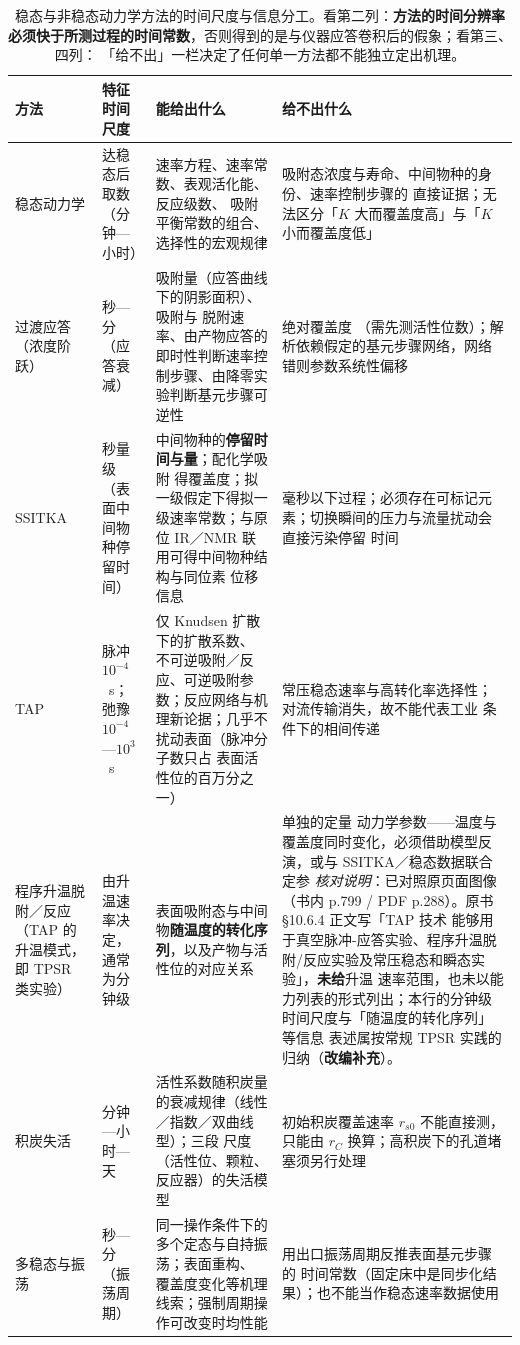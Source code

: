 \begin{table}[tbp]
\centering
\caption{稳态与非稳态动力学方法的时间尺度与信息分工。看第二列：\textbf{方法的时间分辨率
必须快于所测过程的时间常数}，否则得到的是与仪器应答卷积后的假象；看第三、四列：
「给不出」一栏决定了任何单一方法都不能独立定出机理。}
\label{tab:ch10-transient}
{\srcsize
\begin{tabularx}{\twocolwidth}{@{}p{21mm}p{26mm}p{52mm}X@{}}
\toprule
方法 & 特征时间尺度 & 能给出什么 & 给不出什么 \\
\midrule
稳态动力学 & 达稳态后取数（分钟—小时） & 速率方程、速率常数、表观活化能、反应级数、
吸附平衡常数的组合、选择性的宏观规律 & 吸附态浓度与寿命、中间物种的身份、速率控制步骤的
直接证据；无法区分「$K$ 大而覆盖度高」与「$K$ 小而覆盖度低」 \\
过渡应答（浓度阶跃） & 秒—分（应答衰减） & 吸附量（应答曲线下的阴影面积）、吸附与
脱附速率、由产物应答的即时性判断速率控制步骤、由降零实验判断基元步骤可逆性 & 绝对覆盖度
（需先测活性位数）；解析依赖假定的基元步骤网络，网络错则参数系统性偏移 \\
SSITKA & 秒量级（表面中间物种停留时间） & 中间物种的\textbf{停留时间与量}；配化学吸附
得覆盖度；拟一级假定下得拟一级速率常数；与原位 IR／NMR 联用可得中间物种结构与同位素
位移信息 & 毫秒以下过程；必须存在可标记元素；切换瞬间的压力与流量扰动会直接污染停留
时间 \\
TAP & 脉冲 $10^{-4}$~s；弛豫 $10^{-4}$—$10^{3}$~s & 仅 Knudsen 扩散下的扩散系数、
不可逆吸附／反应、可逆吸附参数；反应网络与机理新论据；几乎不扰动表面（脉冲分子数只占
表面活性位的百万分之一） & 常压稳态速率与高转化率选择性；对流传输消失，故不能代表工业
条件下的相间传递 \\
程序升温脱附／反应（TAP 的升温模式，即 TPSR 类实验） & 由升温速率决定，通常为分钟级
& 表面吸附态与中间物\textbf{随温度的转化序列}，以及产物与活性位的对应关系 & 单独的定量
动力学参数——温度与覆盖度同时变化，必须借助模型反演，或与 SSITKA／稳态数据联合定参
\emph{核对说明}：已对照原页面图像（书内 p.799 / PDF p.288）。原书 §10.6.4 正文写「TAP 技术
能够用于真空脉冲-应答实验、程序升温脱附/反应实验及常压稳态和瞬态实验」，\textbf{未给}升温
速率范围，也未以能力列表的形式列出；本行的分钟级时间尺度与「随温度的转化序列」等信息
表述属按常规 TPSR 实践的归纳（\textbf{改编补充}）。 \\
积炭失活 & 分钟—小时—天 & 活性系数随积炭量的衰减规律（线性／指数／双曲线型）；三段
尺度（活性位、颗粒、反应器）的失活模型 & 初始积炭覆盖速率 $r_{s0}$ 不能直接测，只能由
$r_C$ 换算；高积炭下的孔道堵塞须另行处理 \\
多稳态与振荡 & 秒—分（振荡周期） & 同一操作条件下的多个定态与自持振荡；表面重构、
覆盖度变化等机理线索；强制周期操作可改变时均性能 & 用出口振荡周期反推表面基元步骤的
时间常数（固定床中是同步化结果）；也不能当作稳态速率数据使用 \\
\bottomrule
\end{tabularx}}
\end{table}

